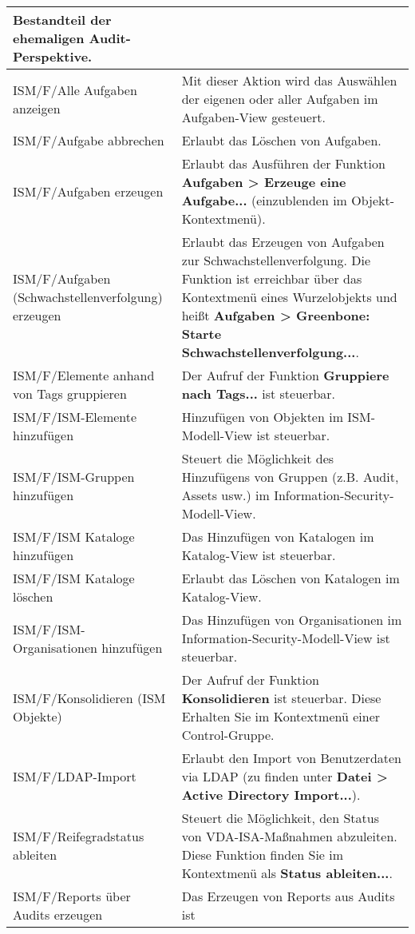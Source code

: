\documentclass[a4paper,10pt]{book}
\begin{document}
\begin{longtable}{| p{5cm} | p{6cm} |}
Bestandteil der ehemaligen Audit-Perspektive. \\[10pt] \hline
ISM/F/Alle Aufgaben anzeigen & Mit dieser Aktion wird das Auswählen der eigenen
oder aller Aufgaben im Aufgaben-View gesteuert. \\[10pt] \hline
ISM/F/Aufgabe abbrechen & Erlaubt das Löschen von Aufgaben. \\[10pt] \hline
ISM/F/Aufgaben erzeugen & Erlaubt das Ausführen der Funktion \textbf{Aufgaben >
Erzeuge eine Aufgabe...} (einzublenden im Objekt-Kontextmenü). \\[10pt] \hline
ISM/F/Aufgaben (Schwachstellenverfolgung) erzeugen & Erlaubt das
Erzeugen von Aufgaben zur Schwachstellenverfolgung. Die Funktion ist erreichbar
über das Kontextmenü eines Wurzelobjekts und heißt \textbf{Aufgaben >
Greenbone: Starte Schwachstellenverfolgung...}. \\[10pt] \hline
ISM/F/Elemente anhand von Tags gruppieren & Der Aufruf der Funktion
\textbf{Gruppiere nach Tags...} ist steuerbar. \\[10pt] \hline
ISM/F/ISM-Elemente hinzufügen & Hinzufügen von Objekten im ISM-Modell-View ist
steuerbar. \\[10pt] \hline
ISM/F/ISM-Gruppen hinzufügen & Steuert die Möglichkeit des Hinzufügens von
Gruppen (z.B. Audit, Assets usw.) im Information-Security-Modell-View. \\[10pt]
\hline
ISM/F/ISM Kataloge hinzufügen & Das Hinzufügen von Katalogen im Katalog-View
ist steuerbar. \\[10pt] \hline
ISM/F/ISM Kataloge löschen & Erlaubt das Löschen von Katalogen im Katalog-View.
\\[10pt] \hline
ISM/F/ISM-Organisationen hinzufügen & Das Hinzufügen von Organisationen im
Information-Security-Modell-View ist steuerbar. \\[10pt] \hline
ISM/F/Konsolidieren (ISM Objekte) & Der Aufruf der Funktion
\textbf{Konsolidieren} ist steuerbar. Diese Erhalten Sie im Kontextmenü einer
Control-Gruppe. \\[10pt] \hline
ISM/F/LDAP-Import & Erlaubt den Import von Benutzerdaten via LDAP (zu finden
unter \textbf{Datei > Active Directory Import...}). \\[10pt] \hline
ISM/F/Reifegradstatus ableiten & Steuert die Möglichkeit, den Status von
VDA-ISA-Maßnahmen abzuleiten. Diese Funktion finden Sie im Kontextmenü als
\textbf{Status ableiten...}. \\[10pt] \hline
ISM/F/Reports über Audits erzeugen & Das Erzeugen von Reports aus Audits ist

\end{longtable}
\end{document}
